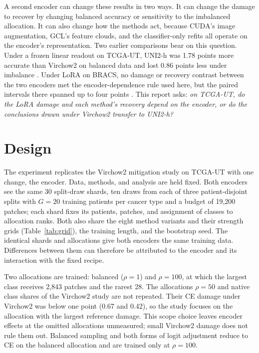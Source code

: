 \documentclass[11pt]{article}
\begin{document}
A second encoder can change these results in two ways. It can change the damage to recover by changing balanced accuracy or sensitivity to the imbalanced allocation. It can also change how the methods act, because CUDA's image augmentation, GCL's feature clouds, and the classifier-only refits all operate on the encoder's representation. Two earlier comparisons bear on this question. Under a frozen linear readout on TCGA-UT, UNI2-h \citep{chen2024uni,mahmoodlab2025uni2h} was 1.78 points more accurate than Virchow2 on balanced data and lost 0.86 points less under imbalance \citep{queisler2026encoderTransfer}. Under LoRA on BRACS, no damage or recovery contrast between the two encoders met the encoder-dependence rule used here, but the paired intervals there spanned up to four points \citep{queisler2026mitigationUni2h}. This report asks: \emph{on TCGA-UT, do the LoRA damage and each method's recovery depend on the encoder, or do the conclusions drawn under Virchow2 transfer to UNI2-h?}

\section{Design}
\label{sec:design}
The experiment replicates the Virchow2 mitigation study on TCGA-UT \citep{queisler2026mitigationTcga} with one change, the encoder. Data, methods, and analysis are held fixed. Both encoders see the same 30 split-draw shards, ten draws from each of three patient-disjoint splits with $G=20$ training patients per cancer type and a budget of 19,200 patches; each shard fixes its patients, patches, and assignment of classes to allocation ranks. Both also share the eight method variants and their strength grids (Table~\ref{tab:grid}), the training length, and the bootstrap seed. The identical shards and allocations give both encoders the same training data. Differences between them can therefore be attributed to the encoder and its interaction with the fixed recipe.

Two allocations are trained: balanced ($\rho=1$) and $\rho=100$, at which the largest class receives 2,843 patches and the rarest 28. The allocations $\rho=50$ and native class shares of the Virchow2 study are not repeated. Their CE damage under Virchow2 was below one point (0.67 and 0.42), so the study focuses on the allocation with the largest reference damage. This scope choice leaves encoder effects at the omitted allocations unmeasured; small Virchow2 damage does not rule them out. Balanced sampling and both forms of logit adjustment reduce to CE on the balanced allocation and are trained only at $\rho=100$.
\end{document}
